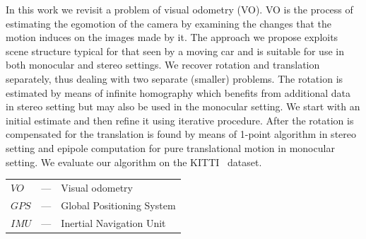 \documentclass[MSc,beforeExam]{iitcsthesis}
\begin{document}







\maketitleEnglish

\abstractEnglish In this work we revisit a problem of visual odometry
(VO). VO is the process of estimating the egomotion of the camera by
examining the changes that the motion induces on the images made by
it. The approach we propose exploits scene structure typical for that
seen by a moving car and is suitable for use in both monocular and
stereo settings. We recover rotation and translation separately, thus
dealing with two separate (smaller) problems. The rotation is
estimated by means of infinite homography which benefits from
additional data in stereo setting but may also be used in the
monocular setting. We start with an initial estimate and then refine
it using iterative procedure. After the rotation is compensated for
the translation is found by means of 1-point algorithm in stereo
setting and epipole computation for pure translational motion in
monocular setting. We evaluate our algorithm on the
KITTI~\cite{geiger2013vision} dataset.

\abbreviationsAndNotationsEnglish

\begin{tabular}{lcl}
$VO$ & --- & Visual odometry\\
$GPS$ & --- & Global Positioning System\\
$IMU$ & --- & Inertial Navigation Unit\\

\end{tabular}

\end{document}
